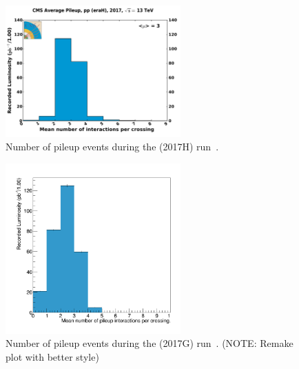 \begin{figure}[htbp]
\centering
  \includegraphics[width=0.6\textwidth]{plots/Data/pileup_pp_lowPU_2017.pdf}
  \caption{Number of pileup events during the \sh (2017H) run~\cite{LumiCalibTwiki}.}
  \label{fig:data:lumiPU13}
\end{figure}

\begin{figure}[htbp]
\centering
  \includegraphics[width=0.6\textwidth]{plots/Data/pileup_5TeV.png}
  \caption{Number of pileup events during the \sg (2017G) run~\cite{LumiCalibTwiki}. (NOTE: Remake plot with better style)}
  \label{fig:data:lumiPU5}
\end{figure}